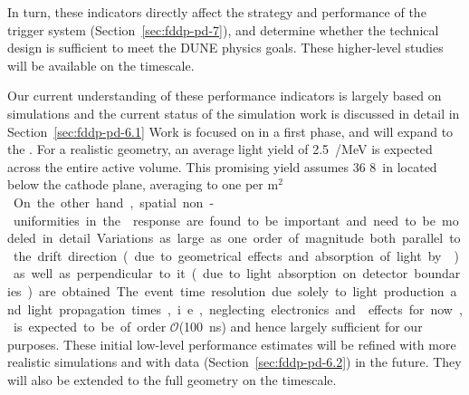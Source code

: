 In turn, these indicators directly affect the strategy and performance of the  trigger system (Section~\ref{sec:fddp-pd-7}), and determine whether the  technical design is sufficient to meet the DUNE physics goals. These higher-level studies will be available on the  timescale. 

Our current understanding of these performance indicators is largely based on  simulations and the current status of the simulation work is discussed in detail in Section~\ref{sec:fddp-pd-6.1} Work is focused on  in a first phase, and will expand to the . For a realistic  geometry, an average light yield of \SI{2.5}{\phel/MeV} is expected across the entire active volume. This promising yield assumes \num{36} \SI{8}{in}  located below the  cathode plane, averaging to one  per \si{m$^2$}. On the other hand, spatial non-uniformities in the  response are found to be important and need to be modeled in detail. Variations as large as one order of magnitude both parallel to the drift direction (due to geometrical effects and absorption of light by \lar) as well as perpendicular to it (due to light absorption on detector boundaries) are obtained. %
The event time resolution due solely to light production and light propagation times, i.e., neglecting electronics and  effects for now, is expected to be of order $\mathcal{O}$(\SI{100}{ns}) and hence largely sufficient for our purposes. These initial low-level performance estimates will be refined with more realistic simulations and with  data (Section~\ref{sec:fddp-pd-6.2}) in the future. They will also be extended to the full  geometry on the  timescale.
